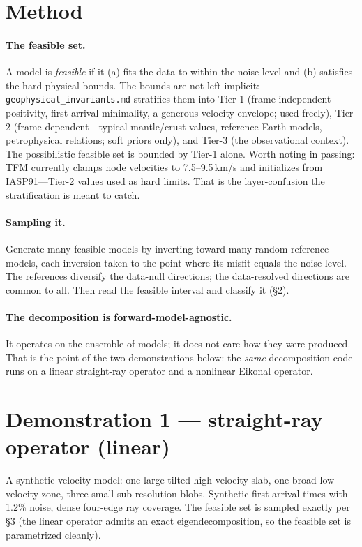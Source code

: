 \documentclass[11pt]{article}
\newcommand{\file}[1]{\texttt{#1}}
\begin{document}
\section{Method}

\paragraph{The feasible set.}
A model is \emph{feasible} if it (a) fits the data to within the noise level
and (b) satisfies the hard physical bounds. The bounds are not left implicit:
\file{geophysical\_invariants.md} stratifies them into Tier-1
(frame-independent---positivity, first-arrival minimality, a generous velocity
envelope; used freely), Tier-2 (frame-dependent---typical mantle/crust values,
reference Earth models, petrophysical relations; soft priors only), and Tier-3
(the observational context). The possibilistic feasible set is bounded by
Tier-1 alone. Worth noting in passing: TFM currently clamps node velocities to
7.5--9.5\,km/s and initializes from IASP91---Tier-2 values used as hard limits.
That is the layer-confusion the stratification is meant to catch.

\paragraph{Sampling it.}
Generate many feasible models by inverting toward many random reference models,
each inversion taken to the point where its misfit equals the noise level. The
references diversify the data-null directions; the data-resolved directions are
common to all. Then read the feasible interval and classify it (\S2).

\paragraph{The decomposition is forward-model-agnostic.}
It operates on the ensemble of models; it does not care how they were produced.
That is the point of the two demonstrations below: the \emph{same}
decomposition code runs on a linear straight-ray operator and a nonlinear
Eikonal operator.

\section{Demonstration 1 --- straight-ray operator (linear)}

A synthetic velocity model: one large tilted high-velocity slab, one broad
low-velocity zone, three small sub-resolution blobs. Synthetic first-arrival
times with 1.2\% noise, dense four-edge ray coverage. The feasible set is
sampled exactly per \S3 (the linear operator admits an exact eigendecomposition,
so the feasible set is parametrized cleanly).
\end{document}

